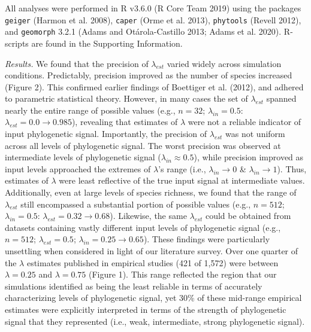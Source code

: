 \documentclass[]{article}
\begin{document}
All analyses were performed in R v3.6.0 (R Core Team 2019) using the
packages \texttt{geiger} (Harmon et al. 2008), \texttt{caper} (Orme et
al. 2013), \texttt{phytools} (Revell 2012), and \texttt{geomorph} 3.2.1
(Adams and Otárola-Castillo 2013; Adams et al. 2020). R-scripts are
found in the Supporting Information. \hfill\break

\emph{Results.} We found that the precision of \(\lambda_{est}\) varied
widely across simulation conditions. Predictably, precision improved as
the number of species increased (Figure 2). This confirmed earlier
findings of Boettiger et al. (2012), and adhered to parametric
statistical theory. However, in many cases the set of \(\lambda_{est}\)
spanned nearly the entire range of possible values (e.g., \(n=32\);
\(\lambda_{in}=0.5\): \(\lambda_{est}= 0.0\to 0.985\)), revealing that
estimates of \(\lambda\) were not a reliable indicator of input
phylogenetic signal. Importantly, the precision of \(\lambda_{est}\) was
not uniform across all levels of phylogenetic signal. The worst
precision was observed at intermediate levels of phylogenetic signal
(\(\lambda_{in}\approx0.5\)), while precision improved as input levels
approached the extremes of \(\lambda\)'s range (i.e.,
\(\lambda_{in}\rightarrow0\) \& \(\lambda_{in}\rightarrow1\)). Thus,
estimates of \(\lambda\) were least reflective of the true input signal
at intermediate values. Additionally, even at large levels of species
richness, we found that the range of \(\lambda_{est}\) still encompassed
a substantial portion of possible values (e.g., \(n=512\);
\(\lambda_{in}=0.5\): \(\lambda_{est} = 0.32\to 0.68\)). Likewise, the
same \(\lambda_{est}\) could be obtained from datasets containing vastly
different input levels of phylogenetic signal (e.g., \(n=512\);
\(\lambda_{est} = 0.5\); \(\lambda_{in} = 0.25 \to 0.65\)). These
findings were particularly unsettling when considered in light of our
literature survey. Over one quarter of the \(\lambda\) estimates
published in empirical studies (421 of 1,572) were between
\(\lambda=0.25\) and \(\lambda=0.75\) (Figure 1). This range reflected
the region that our simulations identified as being the least reliable
in terms of accurately characterizing levels of phylogenetic signal, yet
30\% of these mid-range empirical estimates were explicitly interpreted
in terms of the strength of phylogenetic signal that they represented
(i.e., weak, intermediate, strong phylogenetic signal). \hfill\break
\end{document}
